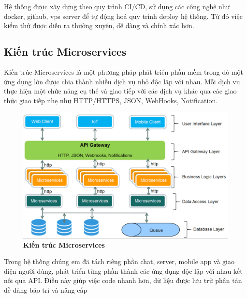 Hệ thống được xây dựng theo quy trình CI/CD, sử dụng các công nghệ như docker, github, vps server để tự động hoá quy trình deploy hệ thống. Từ đó việc kiểm thử được diễn ra thường xuyên, dễ dàng và chính xác hơn. 

\subsection{Kiến trúc Microservices}

Kiến trúc Microservices là một phương pháp phát triển phần mềm trong đó một ứng dụng lớn được chia thành nhiều dịch vụ nhỏ độc lập với nhau. Mỗi dịch vụ thực hiện một chức năng cụ thể và giao tiếp với các dịch vụ khác qua các giao thức giao tiếp nhẹ như HTTP/HTTPS, JSON, WebHooks, Notification.

\begin{figure}[H]
  \centering
  \includegraphics[scale=0.3]{Images/server/deploy/micro-service.png}
  \caption[Kiến trúc Microservices]{\bfseries \fontsize{12pt}{0pt}
  \selectfont Kiến trúc Microservices}
  \label{micro-service} %
\end{figure}

Trong hệ thống chúng em đã tách riêng phần chat, server, mobile app và giao diện người dùng, phát triển từng phần thành các ứng dụng độc lập với nhau kết nối qua API. Điều này giúp việc code nhanh hơn, dữ liệu được lưu trữ phân tán dễ dàng bảo trì và nâng cấp 

